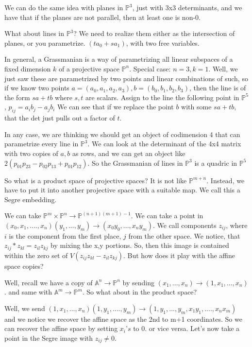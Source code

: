 \documentclass[10pt]{article}
\begin{document}
We can do the same idea with planes in $\mathbb{P}^3$, just with 3x3 determinants, and we have that if the planes are not parallel, then at least one is non-0.

What about lines in $\mathbb{P}^3$? We need to realize them either as the intersection of planes, or you parametrize. $(t a_0 + s a_1)$, with two free variables.

In general, a Grassmanian is a way of parametrizing all linear subspaces of a fixed dimension $k$ of a projective space $\mathbb{P}^n$. Special case: $n = 3, k = 1$. Well, we just saw these are parametrized by two points and linear combinations of such, so if we know two points $a = (a_0,a_1,a_2,a_3), b = (b_0,b_1, b_2,b_3)$, then the line is of the form $sa + tb$ where $s,t$ are scalars. Assign to the line the following point in $\mathbb{P}^5$, $p_{ij} = a_ib_j - a_jb_i$ We can see that if we replace the point $b$ with some $sa + tb$, that the det just pulls out a factor of $t$.

In any case, we are thinking we should get an object of codimension 4 that can parametrize every line in $\mathbb{P}^3$. We can look at the determinant of the 4x4 matrix with two copies of $a,b$ as rows, and we can get an object like $2(p_{01}p_{23} - p_{02}p_{13} + p_{01}p_{12})$. So the Grassmanian of lines in $\mathbb{P}^3$ is a quadric in $\mathbb{P}^5$

So what is a product space of projective spaces? It is not like $\mathbb{P}^{m+n}$. Instead, we have to put it into another projective space with a suitable map. We call this a Segre embedding.

We can take $\mathbb{P}^m \times \mathbb{P}^n \to \mathbb{P}^{(n+1)(m+1) - 1}$. We can take a point in $(x_0,x_1,....,x_n)(y_1,...,y_m) \to (x_0y_0,...,x_ny_m)$. We call components $z_{ij}$, where $i$ is the component from the first place, $j$ from the other space. We notice, that $z_{ij} * z_{kl} = z_{il} z_{kj}$ by mixing the x,y portions. So, then this image is contained within the zero set of $V(z_{ij} z_{kl}- z_{il} z_{kj})$. But how does it play with the affine space copies?

Well, recall we have a copy of $\mathbb{A}^n \to \mathbb{P}^n$ by sending $(x_1,...,x_n) \to (1,x_1,...,x_n)$. and same with $\mathbb{A}^m \to \mathbb{P}^m$. So what about in the product space?

Well, we send $(1,x_1,...,x_n)(1,y_1,....,y_m) \to (1,y_1,...,y_m,x_1y_1,....,x_n x_m)$ and we notice we recover the affine space as the 2nd to m+1 coordinates. So we can recover the affine space by setting $x_i’s$ to 0. or vice versa. Let’s now take a point in the Segre image with $z_{ij} \not = 0$. 
\end{document}
